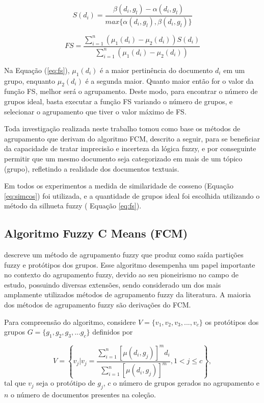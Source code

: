 \begin{equation} 
  S(d_i) = \frac{\beta(d_i, g_l) - \alpha(d_i,g_l)}{max\{\alpha(d_i,g_l), \beta(d_i,g_l)\}} 
  \label{eq:silhuette}
\end{equation}

\begin{equation} 
  FS = \frac{\sum_{i=1}^n{(\mu_1(d_i) - \mu_2(d_i))}S(d_i)}{\sum_{i=1}^n{(\mu_1(d_i) - \mu_2(d_i))}}
  \label{eq:fs}
\end{equation} 

Na Equação (\ref{eq:fs}), $\mu_1(d_i)$ é a maior pertinência do documento $d_i$ em um grupo,
enquanto $\mu_2(d_i)$ é a segunda maior. Quanto maior então for o valor da função FS, melhor será o
agrupamento. Deste modo, para encontrar o número de grupos ideal, basta executar a função FS
variando o número de grupos, e selecionar o agrupamento que tiver o valor máximo de FS.

Toda investigação realizada neste trabalho tomou como base os métodos de agrupamento que derivam do
algoritmo FCM\cite{Bezdek1984}, descrito a seguir, para se beneficiar da capacidade de tratar
imprecisão e incerteza da lógica fuzzy, e por conseguinte permitir que um mesmo documento seja
categorizado em mais de um tópico (grupo), refletindo a realidade dos documentos textuais. 

Em todos os experimentos a medida de similaridade de cosseno (Equação \ref{eq:simcos}) foi
utilizada, e a quantidade de grupos ideal foi escolhida utilizando o método da silhueta fuzzy (
Equação \ref{eq:fs}).

\subsection{Algoritmo Fuzzy C Means (FCM)} 

 descreve um método de agrupamento fuzzy
que produz como saída partições fuzzy e protótipos dos grupos. Esse algoritmo desempenha um papel
importante no contexto do agrupamento fuzzy, devido ao seu pioneirismo no campo de estudo, possuindo
diversas extensões, sendo considerado um dos mais amplamente utilizados métodos de
agrupamento fuzzy da literatura\cite{Pal2005}. A maioria dos métodos de agrupamento fuzzy são
derivações do FCM\cite{Krishnapuram1993}.

Para compreensão do algoritmo, considere $V = \{v_1,v_2,v_3,...,v_c\}$ os protótipos dos grupos $G =
\{g_1,g_2,g_3,...g_c\}$ definidos por 

\begin{equation} 
  V = \left\{ v_j | v_j = \frac{\sum_{i=1}^n[\mu(d_i,g_j)]^m d_i}{\sum_{i=1}^n[\mu(d_i,g_j)]^m}, 
  1 < j \leq c \right\}, 
  \label{eq:prototipos} 
\end{equation}
tal que $v_j$ seja o protótipo de $g_j$, $c$ o número de grupos gerados no agrupamento e $n$ o
número de documentos presentes na coleção. 

